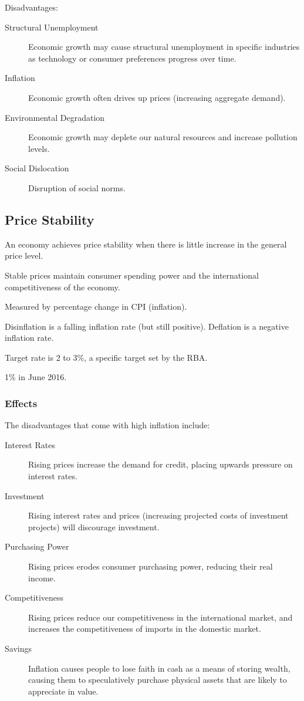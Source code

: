 \documentclass[a4paper,11pt]{article}
\begin{document}
Disadvantages:

\begin{description}
\item [Structural Unemployment] Economic growth may cause structural
	unemployment in specific industries as technology or consumer preferences
	progress over time.
\item [Inflation] Economic growth often drives up prices (increasing
	aggregate demand).
\item [Environmental Degradation] Economic growth may deplete our natural
	resources and increase pollution levels.
\item [Social Dislocation] Disruption of social norms.
\end{description}


\subsection{Price Stability}

An economy achieves price stability when there is little increase in the general
price level.

Stable prices maintain consumer spending power and the international
competitiveness of the economy.

Measured by percentage change in CPI (inflation).

Disinflation is a falling inflation rate (but still positive). Deflation is a
negative inflation rate.

Target rate is 2 to 3\%, a specific target set by the RBA.

1\% in June 2016.


\subsubsection{Effects}

The disadvantages that come with high inflation include:

\begin{description}
\item [Interest Rates] Rising prices increase the demand for credit, placing
	upwards pressure on interest rates.
\item [Investment] Rising interest rates and prices (increasing projected costs
	of investment projects) will discourage investment.
\item [Purchasing Power] Rising prices erodes consumer purchasing power,
	reducing their real income.
\item [Competitiveness] Rising prices reduce our competitiveness in the
	international market, and increases the competitiveness of imports in the
	domestic market.
\item [Savings] Inflation causes people to lose faith in cash as a means of
	storing wealth, causing them to speculatively purchase physical assets that
	are likely to appreciate in value.
\end{description}
\end{document}
